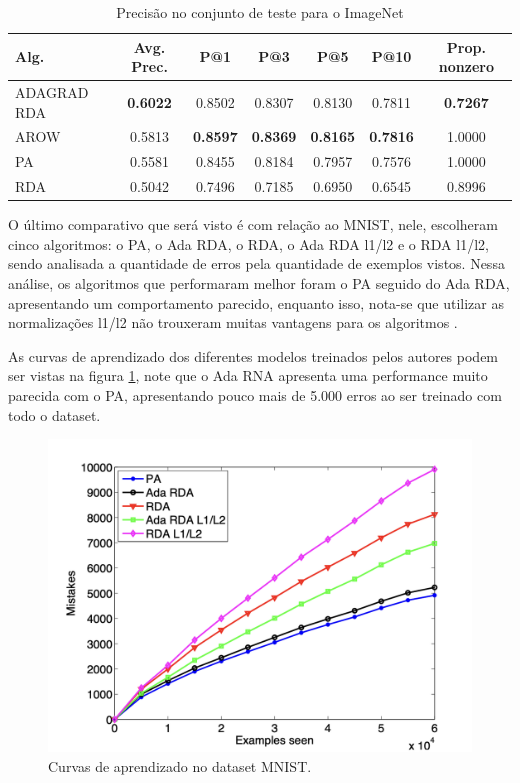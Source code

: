 \begin{table}[htbp]
    \centering
    \caption{Precisão no conjunto de teste para o ImageNet}
    \label{tab:resultados-imagenet-adagrad}
    \begin{tabular}{l c c c c c c}
        \toprule
        Alg. & Avg. Prec. & P@1 & P@3 & P@5 & P@10 & Prop. nonzero \\
        \midrule
        ADAGRAD RDA & \textbf{0.6022} & 0.8502 & 0.8307 & 0.8130 & 0.7811 & \textbf{0.7267} \\
        AROW & 0.5813 & \textbf{0.8597} & \textbf{0.8369} & \textbf{0.8165} & \textbf{0.7816} & 1.0000 \\
        PA & 0.5581 & 0.8455 & 0.8184 & 0.7957 & 0.7576 & 1.0000 \\
        RDA & 0.5042 & 0.7496 & 0.7185 & 0.6950 & 0.6545 & 0.8996 \\
        \bottomrule
    \end{tabular}
\end{table}

O último comparativo que será visto é com relação ao MNIST, nele, \textcite{AdaGradMethod} escolheram cinco algoritmos: o PA, o Ada RDA, o RDA, o Ada RDA l1/l2 e o RDA l1/l2, sendo analisada a quantidade de erros pela quantidade de exemplos vistos. Nessa análise, os algoritmos que performaram melhor foram o PA seguido do Ada RDA, apresentando um comportamento parecido, enquanto isso, nota-se que utilizar as normalizações l1/l2 não trouxeram muitas vantagens para os algoritmos \parencite{AdaGradMethod}.

As curvas de aprendizado dos diferentes modelos treinados pelos autores podem ser vistas na figura \ref{fig:curvas-de-aprendizado-adagrad-mnist}, note que o Ada RNA apresenta uma performance muito parecida com o PA, apresentando pouco mais de 5.000 erros ao ser treinado com todo o dataset.

\begin{figure}[h]
    \centering
    \includegraphics[width=0.65\linewidth]{../imagens/retropropagacao-gradiente/comparativo-adagrad-mnist.png}
    \caption{Curvas de aprendizado no dataset MNIST.}
    \label{fig:curvas-de-aprendizado-adagrad-mnist}
\end{figure}

